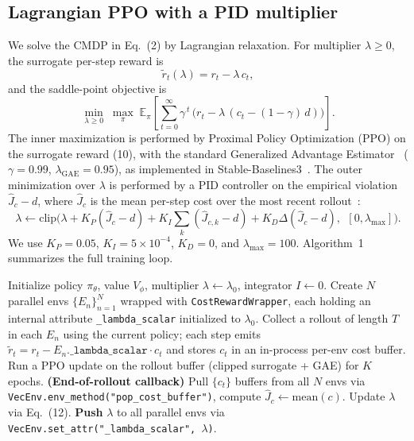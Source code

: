 \documentclass[11pt,a4paper]{article}
\begin{document}
\subsection{Lagrangian PPO with a PID multiplier}

We solve the CMDP in Eq.~(2) by Lagrangian
relaxation. For multiplier $\lambda\ge 0$, the surrogate per-step
reward is
\begin{equation}
\tilde r_t(\lambda) = r_t - \lambda\,c_t,
\label{eq:lagrangian_reward}
\end{equation}
and the saddle-point objective is
\begin{equation}
\min_{\lambda\ge 0}\;\max_{\pi}\;
\mathbb{E}_\pi\!\left[\sum_{t=0}^{\infty}\gamma^{\,t}\,
                 \big(r_t - \lambda\,(c_t - (1-\gamma)\,d)\big)\right].
\label{eq:saddle}
\end{equation}
The inner maximization is performed by Proximal Policy Optimization
(PPO) on the surrogate reward (10), with the
standard Generalized Advantage Estimator~\citep{schulman2015gae}
($\gamma=0.99$, $\lambda_{\mathrm{GAE}}=0.95$), as implemented in
Stable-Baselines3~\citep{raffin2021sb3}. The outer minimization over $\lambda$ is
performed by a PID controller on the empirical violation
$\hat J_c - d$, where $\hat J_c$ is the mean per-step cost over the
most recent rollout~\citep{stooke2020responsive}:
\begin{equation}
\lambda \leftarrow \mathrm{clip}\Big(
   \lambda + K_P(\hat J_c - d) + K_I\!\!\sum_{k}(\hat J_{c,k}-d)
   + K_D\Delta(\hat J_c-d),\;\,
   [0,\lambda_{\max}]\Big).
\label{eq:pid_lambda}
\end{equation}
We use $K_P=0.05$, $K_I=5\times 10^{-4}$, $K_D=0$, and
$\lambda_{\max}=100$. Algorithm~1 summarizes the full
training loop.

\begin{algorithm}[t]
\caption{Lagrangian PPO with PID multiplier and subprocess-safe
$\lambda$ propagation.}
\label{alg:lpppo}
\begin{algorithmic}[1]
\State Initialize policy $\pi_\theta$, value $V_\phi$, multiplier
       $\lambda \leftarrow \lambda_0$, integrator $I\leftarrow 0$.
\State Create $N$ parallel envs $\{E_n\}_{n=1}^N$ wrapped with
       \texttt{CostRewardWrapper}, each holding an internal
       attribute \texttt{\_lambda\_scalar} initialized to $\lambda_0$.
  \State Collect a rollout of length $T$ in each $E_n$ using the
         current policy; each step emits
         $\tilde r_t = r_t - E_n.\texttt{\_lambda\_scalar}\cdot c_t$
         and stores $c_t$ in an in-process per-env cost buffer.
  \State Run a PPO update on the rollout buffer (clipped surrogate
         + GAE) for $K$ epochs.
  \State \textbf{(End-of-rollout callback)} Pull
         $\{c_t\}$ buffers from all $N$ envs via
         \texttt{VecEnv.env\_method("pop\_cost\_buffer")}, compute
         $\hat J_c \leftarrow \mathrm{mean}(c)$.
  \State Update $\lambda$ via Eq.~(12).
  \State \textbf{Push} $\lambda$ to all parallel envs via
         \texttt{VecEnv.set\_attr("\_lambda\_scalar",~$\lambda$)}.
\EndFor
\end{algorithmic}
\end{algorithm}
\end{document}
